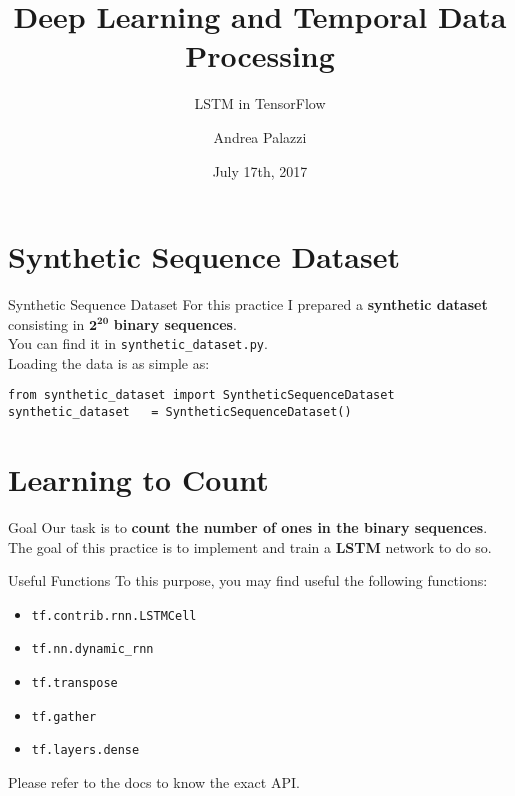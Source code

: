 \documentclass[aspectratio=169]{beamer}
\title[Deep Learning and Temporal Data Processing]{Deep Learning and Temporal Data Processing}
\subtitle{LSTM in TensorFlow}
\institute{University of Modena and Reggio Emilia}
\author{Andrea Palazzi}
\date{July 17th, 2017}
\def\thisframelogos{}
\newcommand{\framelogo}[1]{\def\thisframelogos{#1}}
\begin{document}
\framelogo{img/template/logo_unimore_white.png}





\section{Synthetic Sequence Dataset}

\begin{frame}[fragile]{Synthetic Sequence Dataset}
For this practice I prepared a \textbf{synthetic dataset} consisting in $\bm{2^{20}}$ \textbf{binary sequences}.\\
\vspace{0.5cm}
You can find it in \texttt{synthetic\_dataset.py}.\\
\vspace{0.5cm}
Loading the data is as simple as:
\begin{verbatim}
from synthetic_dataset import SyntheticSequenceDataset
synthetic_dataset   = SyntheticSequenceDataset()
\end{verbatim}
\end{frame}


\section{Learning to Count}

\begin{frame}[fragile]{Goal}
Our task is to \textbf{count the number of ones in the binary sequences}.\\
\vspace{0.5cm}
The goal of this practice is to implement and train a \textbf{LSTM} \cite{hochreiter1997long} network to do so.
\end{frame}


\begin{frame}{Useful Functions}
To this purpose, you may find useful the following functions:
\begin{itemize}
\item \texttt{tf.contrib.rnn.LSTMCell}
\item \texttt{tf.nn.dynamic\_rnn}
\item \texttt{tf.transpose}
\item \texttt{tf.gather}
\item \texttt{tf.layers.dense}
\end{itemize}
Please refer to the docs to know the exact API.
\end{frame}
\end{document}
